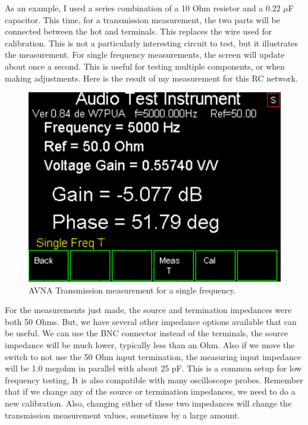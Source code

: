 %
As an example, I used a series combination of a 10 Ohm resistor and a 0.22 $\mu$F capacitor.  This time, for a transmission measurement, the two parts will be connected between the hot  and  terminals. This replaces the wire used for calibration.  This is not a particularly interesting circuit to test, but it illustrates the measurement.  For single frequency measurements, the screen will update about once a second.  This is useful for testing multiple components, or when making adjustments.  Here is the result of my measurement for this RC network.
\begin{figure}[H]
\begin{center}
\includegraphics[scale=0.75]{./images/AVNA_047.pdf}
\caption{AVNA Transmission measurement for a single frequency.}
\label{AVNA_047-label}
\end{center}
\end{figure}
%
For the measurements just made, the source and termination impedances were both 50 Ohms. But, we have several other impedance options available that can be useful.  We can use the BNC connector instead of the terminals, the source impedance will be much lower, typically less than an Ohm.  Also if we move the switch to not use the 50 Ohm input termination, the measuring input impedance will be 1.0 megohm in parallel with about 25 pF.  This is a common setup for low frequency testing,  It is also compatible with many oscilloscope probes.  Remember that if we change any of the source or termination impedances, we need to do a new calibration.  Also, changing either of these two impedances will change the transmission measurement values, sometimes by a large amount.

